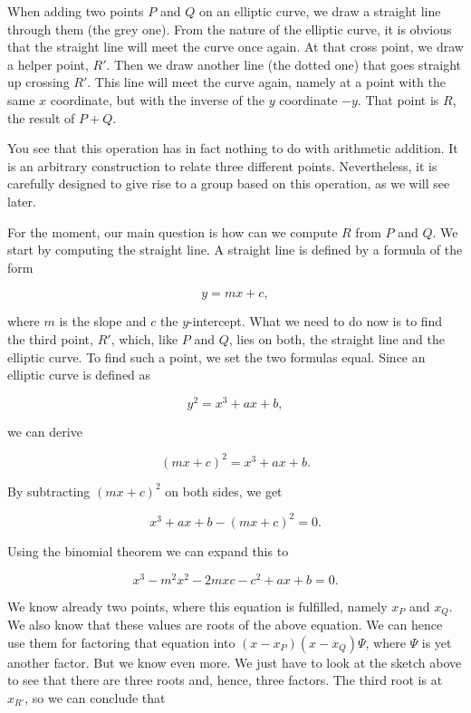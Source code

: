 \documentclass[tikz]{scrreprt}
\begin{document}
When adding two points $P$ and $Q$ on an elliptic curve, 
we draw a straight line through them (the grey one).
From the nature of the elliptic curve, it is obvious
that the straight line will meet the curve once again.
At that cross point, we draw a helper point, $R'$.
Then we draw another line (the dotted one) that goes
straight up crossing $R'$. This line will meet the curve
again, namely at a point with the same $x$ coordinate,
but with the inverse of the $y$ coordinate $-y$.
That point is $R$, the result of $P + Q$.

You see that this operation has in fact nothing to do
with arithmetic addition. It is an arbitrary construction
to relate three different points.
Nevertheless, it is carefully designed to give rise
to a group based on this operation, as we will see later.

For the moment, our main question is how can we
compute $R$ from $P$ and $Q$. We start by computing
the straight line. A straight line is defined by
a formula of the form

\begin{equation}
y = mx + c,
\end{equation}

where $m$ is the slope and $c$ the $y$-intercept.
What we need to do now is to find the third point,
$R'$, which, like $P$ and $Q$, lies on both,
the straight line and the elliptic curve.
To find such a point, we set the two formulas
equal. Since an elliptic curve is defined as

\begin{equation}  
y^2 = x^3 + ax + b, 
\end{equation}  

we can derive

\begin{equation}  
(mx + c)^2 = x^3 + ax + b.
\end{equation}

By subtracting $(mx+c)^2$ on both sides,
we get 

\begin{equation}  
x^3 + ax + b - (mx + c)^2 = 0.
\end{equation}

Using the binomial theorem 
we can expand this to

\begin{equation}  
x^3 - m^2x^2 - 2mxc - c^2 + ax + b = 0.
\end{equation}

We know already two points, where this equation is fulfilled,
namely $x_P$ and $x_Q$. We also know that these values
are roots of the above equation. We can hence use them for
factoring that equation into $(x-x_P)(x-x_Q)\Psi$,
where $\Psi$ is yet another factor. But we know even more.
We just have to look at the sketch above to see that there
are three roots and, hence, three factors. The third root
is at $x_{R'}$, so we can conclude that 
\end{document}
